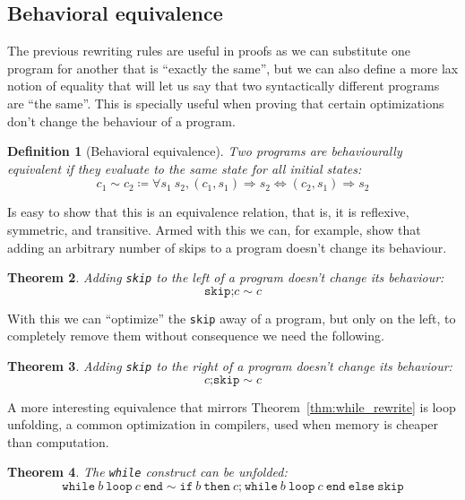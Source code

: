 \documentclass[
  a4paper, 
  10pt, 
  parskip=half, 
  DIV=20,
  toc=bibliography,
  usegeometry,
]{scrartcl}
\newtheorem{theorem}{Theorem}[section]
\newtheorem{definition}[theorem]{Definition}
\newcommand{\bigstep}{\Longrightarrow}
\begin{document}
\subsection{Behavioral equivalence}

The previous rewriting rules are useful in proofs as we can substitute one program
for another that is \enquote{exactly the same}, but we can also define a more
lax notion of equality that will let us say that two syntactically different
programs are \enquote{the same}. This is specially useful when proving
that certain optimizations don't change the behaviour of a program.

\begin{definition}[Behavioral equivalence]
  Two programs are behaviourally equivalent if they evaluate to the same state
  for all initial states:
  \[
  c_1 \sim c_2 \coloneqq \forall s_1 \ s_2, (c_1, s_1) \bigstep s_2 \iff (c_2, s_1) \bigstep s_2
  \]
\end{definition}

Is easy to show that this is an equivalence relation, that is, it is reflexive,
symmetric, and transitive. Armed with this we can, for example, show that adding
an arbitrary number of skips to a program doesn't change its behaviour.

\begin{theorem}
  Adding \texttt{skip} to the left of a program doesn't change its behaviour:
  \[
  \texttt{skip} \texttt{;} c \sim c
  \]
\end{theorem}

With this we can \enquote{optimize} the \texttt{skip} away of a program, but only
on the left, to completely remove them without consequence we need the following.

\begin{theorem}
  Adding \texttt{skip} to the right of a program doesn't change its behaviour:
  \[
  c \texttt{;} \texttt{skip} \sim c
  \]
\end{theorem}

A more interesting equivalence that mirrors Theorem~\ref{thm:while_rewrite} is
loop unfolding, a common optimization in compilers, used when memory is cheaper
than computation.

\begin{theorem}
  The \texttt{while} construct can be unfolded:
  \[
  \texttt{while} \ b \ \texttt{loop} \ c \ \texttt{end} \sim 
  \texttt{if} \ b \ \texttt{then} \ c \texttt{;} \ \texttt{while} \ b \ \texttt{loop} \ c \ \texttt{end} \ \texttt{else} \ \texttt{skip}
  \]
\end{theorem}
\end{document}
